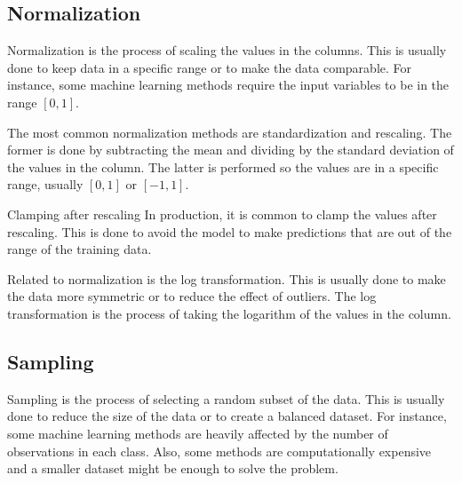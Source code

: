 \subsection{Normalization}

Normalization is the process of scaling the values in the columns.  This is usually done to
keep data in a specific range or to make the data comparable.  For instance, some machine
learning methods require the input variables to be in the range $[0, 1]$.

The most common normalization methods are standardization and rescaling.  The former is done
by subtracting the mean and dividing by the standard deviation of the values in the column.
The latter is performed so the values are in a specific range, usually $[0, 1]$ or $[-1, 1]$.

\begin{hlbox}{Clamping after rescaling}
  In production, it is common to clamp the values after rescaling.  This is done to avoid
  the model to make predictions that are out of the range of the training data.
\end{hlbox}

Related to normalization is the log transformation.  This is usually done to make the data
more symmetric or to reduce the effect of outliers.  The log transformation is the process
of taking the logarithm of the values in the column.


\subsection{Sampling}

Sampling is the process of selecting a random subset of the data.  This is usually done to
reduce the size of the data or to create a balanced dataset.  For instance, some machine
learning methods are heavily affected by the number of observations in each class.
Also, some methods are computationally expensive and a smaller dataset might be enough to
solve the problem.

